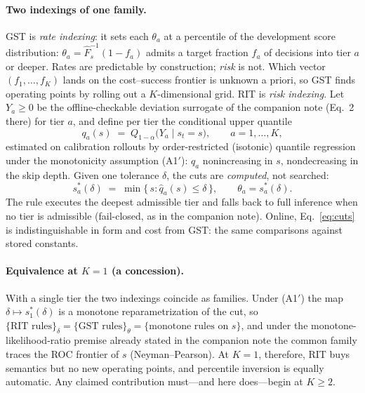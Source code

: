 \documentclass{article}
\begin{document}
\paragraph{Two indexings of one family.}
GST is \emph{rate indexing}: it sets each $\theta_a$ at a percentile of
the development score distribution: $\theta_a = \hat{F}_s^{-1}(1 - f_a)$
admits a target fraction $f_a$ of decisions into tier $a$ or deeper. Rates
are predictable by construction; \emph{risk} is not. Which vector
$(f_1, \dots, f_K)$ lands on the cost--success frontier is unknown a priori,
so GST finds operating points by rolling out a $K$-dimensional grid. RIT
is \emph{risk indexing}. Let $Y_a \ge 0$
be the offline-checkable deviation surrogate of the companion note
(Eq.~2 there) for tier $a$, and define per tier the conditional upper
quantile
\begin{equation}
q_a(s) \;=\; Q_{1-\alpha}\bigl( Y_a \mid s_t = s \bigr),
\qquad a = 1, \dots, K,
\label{eq:qa}
\end{equation}
estimated on calibration rollouts by order-restricted (isotonic) quantile
regression under the monotonicity assumption (A1$'$): $q_a$ nonincreasing in
$s$, nondecreasing in the skip depth. Given one tolerance $\delta$, the cuts
are \emph{computed}, not searched:
\begin{equation}
s^{*}_a(\delta) \;=\; \min\{\, s : \hat{q}_a(s) \le \delta \,\},
\qquad
\theta_a = s^{*}_a(\delta) .
\label{eq:cuts}
\end{equation}
The rule executes the deepest admissible tier and falls back to full
inference when no tier is admissible (fail-closed, as in the companion
note). Online, Eq.~\ref{eq:cuts} is indistinguishable in form and cost from
GST: the same comparisons against stored constants.

\paragraph{Equivalence at $K = 1$ (a concession).}
With a single tier the two indexings coincide as families. Under (A1$'$) the
map $\delta \mapsto s^{*}_1(\delta)$ is a monotone reparametrization of the
cut, so
$\{\text{RIT rules}\}_{\delta} =
\{\text{GST rules}\}_{\theta} =
\{\text{monotone rules on } s\}$,
and under the monotone-likelihood-ratio premise already stated in the
companion note the common family traces the ROC frontier of $s$
(Neyman--Pearson). At $K=1$, therefore, RIT buys semantics but no
new operating points, and percentile inversion is equally automatic. Any
claimed contribution must---and here does---begin at $K \ge 2$.
\end{document}
